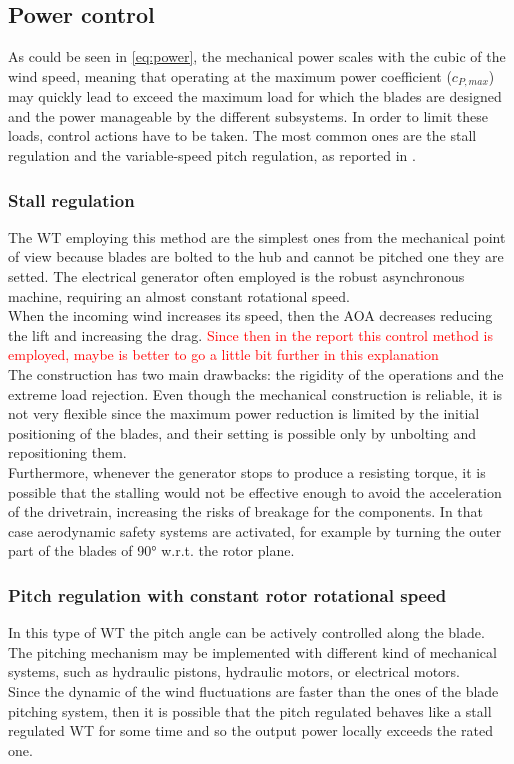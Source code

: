 \subsection{Power control}
As could be seen in \autoref{eq:power}, the mechanical power scales with the cubic of the wind speed, meaning that operating at the maximum power coefficient ($c_{P, max}$) may quickly lead to exceed the maximum load for which the blades are designed and the power manageable by the different subsystems. In order to limit these loads, control actions have to be taken. The most common ones are the stall regulation and the variable-speed pitch regulation, as reported in \cite{Aerodynamics_of_wind_turbines}.
\subsubsection{Stall regulation}\label{subsec:stall_regulation_theory}
The \acrshort{WT} employing this method are the simplest ones from the mechanical point of view because blades are bolted to the hub and cannot be pitched one they are setted. The electrical generator often employed is the robust asynchronous machine, requiring an almost constant rotational speed.\\
When the incoming wind increases its speed, then the \acrshort{AOA} decreases reducing the lift and increasing the drag. \textcolor{red}{Since then in the report this control method is employed, maybe is better to go a little bit further in this explanation}\\
The construction has two main drawbacks: the rigidity of the operations and the extreme load rejection. Even though the mechanical construction is reliable, it is not very flexible since the maximum power reduction is limited by the initial positioning of the blades, and their setting is possible only by unbolting and repositioning them.\\
Furthermore, whenever the generator stops to produce a resisting torque, it is possible that the stalling would not be effective enough to avoid the acceleration of the drivetrain, increasing the risks of breakage for the components. In that case aerodynamic safety systems are activated, for example by turning the outer part of the blades of 90$\si{\degree}$ w.r.t. the rotor plane. 

\subsubsection{Pitch regulation with constant rotor rotational speed}
In this type of \acrshort{WT} the pitch angle can be actively controlled along the blade. The pitching mechanism may be implemented with different kind of mechanical systems, such as hydraulic pistons, hydraulic motors, or electrical motors. \\
Since the dynamic of the wind fluctuations are faster than the ones of the blade pitching system, then it is possible that the pitch regulated behaves like a stall regulated \acrshort{WT} for some time and so the output power locally exceeds the rated one.


